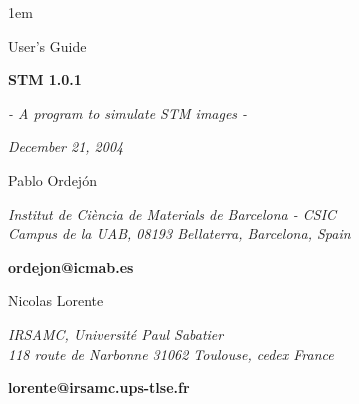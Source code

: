 %
%
%



\textheight 22cm
\textwidth 16cm
\oddsidemargin 1mm
\topmargin -15mm

\baselineskip=14pt
\parskip 5pt
\parindent 1em




\begin{titlepage}

\begin{center}

\vspace{1cm}

{\huge {\sc User's Guide}}

\vspace{4cm}

{\Huge {\bf {\sc STM} 1.0.1} }

\vspace{0.5 cm}

{\Large {\it - A program to simulate STM images -}}


{\Large {\it December 21, 2004}}

\vspace{3cm}

{\Large Pablo Ordej\'on}

\vspace{5pt}

{\it Institut de Ci\`encia de Materials de Barcelona - CSIC\\
Campus de la UAB, 08193 Bellaterra, Barcelona, Spain}

\vspace{2pt}
{\bf ordejon@icmab.es}

\vspace{1cm}

\vspace{3cm}
{\Large Nicolas Lorente}

\vspace{5pt}

{\it IRSAMC, 
Universit\'e Paul Sabatier \\
118 route de Narbonne
31062 Toulouse, cedex France
}

\vspace{2pt}
{\bf lorente@irsamc.ups-tlse.fr}

\vspace{7mm}
\end{center}

\end{titlepage}

